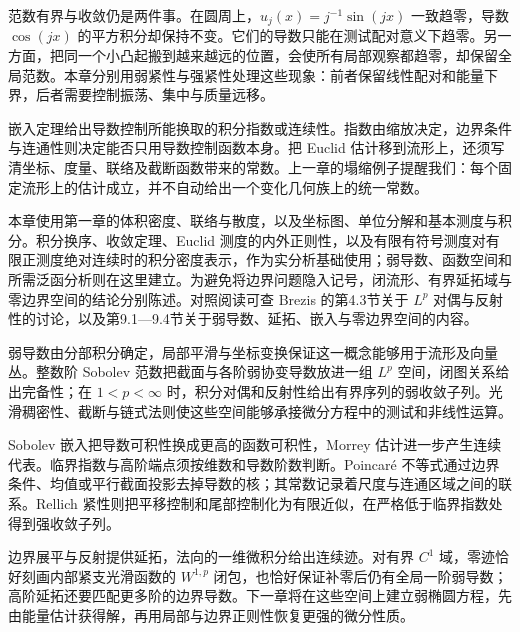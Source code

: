 \ProseParagraphBreak

范数有界与收敛仍是两件事。在圆周上，\(u_j(x)=j^{-1}\sin(jx)\) 一致趋零，导数 \(\cos(jx)\) 的平方积分却保持不变。它们的导数只能在测试配对意义下趋零。另一方面，把同一个小凸起搬到越来越远的位置，会使所有局部观察都趋零，却保留全局范数。本章分别用弱紧性与强紧性处理这些现象：前者保留线性配对和能量下界，后者需要控制振荡、集中与质量远移。

\ProseParagraphBreak

嵌入定理给出导数控制所能换取的积分指数或连续性。指数由缩放决定，边界条件与连通性则决定能否只用导数控制函数本身。把 Euclid 估计移到流形上，还须写清坐标、度量、联络及截断函数带来的常数。上一章的塌缩例子提醒我们：每个固定流形上的估计成立，并不自动给出一个变化几何族上的统一常数。

\ProseParagraphBreak

本章使用第一章的体积密度、联络与散度，以及坐标图、单位分解和基本测度与积分。积分换序、收敛定理、Euclid 测度的内外正则性，以及有限有符号测度对有限正测度绝对连续时的积分密度表示，作为实分析基础使用；弱导数、函数空间和所需泛函分析则在这里建立。为避免将边界问题隐入记号，闭流形、有界延拓域与零边界空间的结论分别陈述。对照阅读可查 Brezis 的第4.3节关于 \(L^p\) 对偶与反射性的讨论，以及第9.1—9.4节关于弱导数、延拓、嵌入与零边界空间的内容\cite[第4.3节，第9.1—9.4节]{Brezis2011}。








\begin{chaptersummary}
弱导数由分部积分确定，局部平滑与坐标变换保证这一概念能够用于流形及向量丛。整数阶 Sobolev 范数把截面与各阶弱协变导数放进一组 \(L^p\) 空间，闭图关系给出完备性；在 \(1<p<\infty\) 时，积分对偶和反射性给出有界序列的弱收敛子列。光滑稠密性、截断与链式法则使这些空间能够承接微分方程中的测试和非线性运算。

\ProseParagraphBreak

Sobolev 嵌入把导数可积性换成更高的函数可积性，Morrey 估计进一步产生连续代表。临界指数与高阶端点须按维数和导数阶数判断。Poincaré 不等式通过边界条件、均值或平行截面投影去掉导数的核；其常数记录着尺度与连通区域之间的联系。Rellich 紧性则把平移控制和尾部控制化为有限近似，在严格低于临界指数处得到强收敛子列。

\ProseParagraphBreak

边界展平与反射提供延拓，法向的一维微积分给出连续迹。对有界 \(C^1\) 域，零迹恰好刻画内部紧支光滑函数的 \(W^{1,p}\) 闭包，也恰好保证补零后仍有全局一阶弱导数；高阶延拓还要匹配更多阶的边界导数。下一章将在这些空间上建立弱椭圆方程，先由能量估计获得解，再用局部与边界正则性恢复更强的微分性质。
\end{chaptersummary}

